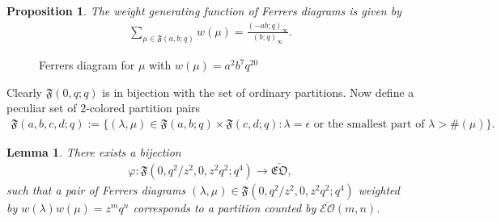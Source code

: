 \documentclass[12pt,reqno]{amsart}
\numberwithin{equation}{section}
\theoremstyle{plain}
\newtheorem{lemma}[theorem]{Lemma}
\newtheorem{proposition}[theorem]{Proposition}
\theoremstyle{definition}
\def\fF{\mathfrak{F}}
\def\bfEO{\overline{\mathfrak{EO}}}
\begin{document}
\begin{proposition}\label{prop:gf-Ferdia}
The weight generating function of Ferrers diagrams is given by
\begin{align*}
\sum_{\mu\in\mathfrak{F}(a,b;q)}w(\mu) = \frac{(-ab;q)_{\infty}}{(b;q)_{\infty}}.
\end{align*}
\end{proposition}

\begin{figure}[t!]
\begin{ferrers}
\end{ferrers}
\caption{Ferrers diagram for $\mu$ with $w(\mu)=a^2b^7q^{20}$}
\label{2-color}
\end{figure}

Clearly $\mathfrak{F}(0,q;q)$ is in bijection with the set of ordinary partitions. Now define a peculiar set
of $2$-colored partition pairs
\begin{align*}
\fF(a,b,c,d;q):=\{(\lambda,\mu)\in\fF(a,b;q)\times\fF(c,d;q):
\textrm{$\lambda=\epsilon$~or~the~smallest~part~of~$\lambda$}>\#(\mu)\}.
\end{align*}

\begin{lemma}\label{lem:Ferrersdiag and bEO}
There exists a bijection
\begin{align*}
\varphi: \fF(0,q^2/z^2,0,z^2q^2;q^4)\to \bfEO,
\end{align*}
such that a pair of Ferrers diagrams $(\lambda,\mu)\in \fF(0,q^2/z^2,0,z^2q^2;q^4)$ weighted by
$w(\lambda)w(\mu)=z^mq^n$ corresponds to a partition counted by $\overline{\mathcal{EO}}(m,n)$.
\end{lemma}
\end{document}
